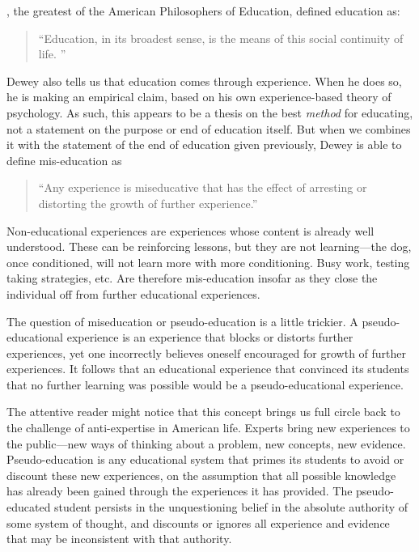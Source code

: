 , the greatest of the American Philosophers of Education, defined education as:

\begin{quote}

``Education, in its broadest sense, is the means of this social continuity of life. '' ~\citep[p.3]{Dewey:1916tl}
\end{quote}

Dewey also tells us that education comes through experience. When he does so, he is making an empirical claim, based on his own experience-based theory of psychology. As such, this appears to be a thesis on the best \emph{method} for educating, not a statement on the purpose or end of education itself. But when we combines it with the statement of the end of education given previously, Dewey is able to define mis-education as 

\begin{quote}

``Any experience is miseducative that has the effect of arresting or distorting the growth of further experience.'' ~\citep{Dewey:7qEGcm0l}
\end{quote}

Non-educational experiences are experiences whose content is already well understood. These can be reinforcing lessons, but they are not learning---the dog, once conditioned, will not learn more with more conditioning. Busy work, testing taking strategies, etc. Are therefore mis-education insofar as they close the individual off from further educational experiences. 

The question of miseducation or pseudo-education is a little trickier. A pseudo-educational experience is an experience that blocks or distorts further experiences, yet one incorrectly believes oneself encouraged for growth of further experiences. It follows that an educational experience that convinced its students that no further learning was possible would be a pseudo-educational experience.

The attentive reader might notice that this concept brings us full circle back to the challenge of anti-expertise in American life. Experts bring new experiences to the public---new ways of thinking about a problem, new concepts, new evidence. Pseudo-education is any educational system that primes its students to avoid or discount these new experiences, on the assumption that all possible knowledge has already been gained through the experiences it has provided. The pseudo-educated student persists in the unquestioning belief in the absolute authority of some system of thought, and discounts or ignores all experience and evidence that may be inconsistent with that authority.

